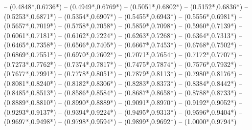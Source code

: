 {	-- ({0.4848*\dx},{0.6736*\dy}) %
	-- ({0.4949*\dx},{0.6769*\dy}) %
	-- ({0.5051*\dx},{0.6802*\dy}) %
	-- ({0.5152*\dx},{0.6836*\dy}) %
	-- ({0.5253*\dx},{0.6871*\dy}) %
	-- ({0.5354*\dx},{0.6907*\dy}) %
	-- ({0.5455*\dx},{0.6943*\dy}) %
	-- ({0.5556*\dx},{0.6981*\dy}) %
	-- ({0.5657*\dx},{0.7019*\dy}) %
	-- ({0.5758*\dx},{0.7058*\dy}) %
	-- ({0.5859*\dx},{0.7098*\dy}) %
	-- ({0.5960*\dx},{0.7139*\dy}) %
	-- ({0.6061*\dx},{0.7181*\dy}) %
	-- ({0.6162*\dx},{0.7224*\dy}) %
	-- ({0.6263*\dx},{0.7268*\dy}) %
	-- ({0.6364*\dx},{0.7313*\dy}) %
	-- ({0.6465*\dx},{0.7358*\dy}) %
	-- ({0.6566*\dx},{0.7405*\dy}) %
	-- ({0.6667*\dx},{0.7453*\dy}) %
	-- ({0.6768*\dx},{0.7502*\dy}) %
	-- ({0.6869*\dx},{0.7551*\dy}) %
	-- ({0.6970*\dx},{0.7602*\dy}) %
	-- ({0.7071*\dx},{0.7654*\dy}) %
	-- ({0.7172*\dx},{0.7707*\dy}) %
	-- ({0.7273*\dx},{0.7762*\dy}) %
	-- ({0.7374*\dx},{0.7817*\dy}) %
	-- ({0.7475*\dx},{0.7874*\dy}) %
	-- ({0.7576*\dx},{0.7932*\dy}) %
	-- ({0.7677*\dx},{0.7991*\dy}) %
	-- ({0.7778*\dx},{0.8051*\dy}) %
	-- ({0.7879*\dx},{0.8113*\dy}) %
	-- ({0.7980*\dx},{0.8176*\dy}) %
	-- ({0.8081*\dx},{0.8240*\dy}) %
	-- ({0.8182*\dx},{0.8306*\dy}) %
	-- ({0.8283*\dx},{0.8373*\dy}) %
	-- ({0.8384*\dx},{0.8442*\dy}) %
	-- ({0.8485*\dx},{0.8513*\dy}) %
	-- ({0.8586*\dx},{0.8584*\dy}) %
	-- ({0.8687*\dx},{0.8658*\dy}) %
	-- ({0.8788*\dx},{0.8733*\dy}) %
	-- ({0.8889*\dx},{0.8810*\dy}) %
	-- ({0.8990*\dx},{0.8889*\dy}) %
	-- ({0.9091*\dx},{0.8970*\dy}) %
	-- ({0.9192*\dx},{0.9052*\dy}) %
	-- ({0.9293*\dx},{0.9137*\dy}) %
	-- ({0.9394*\dx},{0.9224*\dy}) %
	-- ({0.9495*\dx},{0.9313*\dy}) %
	-- ({0.9596*\dx},{0.9404*\dy}) %
	-- ({0.9697*\dx},{0.9498*\dy}) %
	-- ({0.9798*\dx},{0.9594*\dy}) %
	-- ({0.9899*\dx},{0.9692*\dy}) %
	-- ({1.0000*\dx},{0.9794*\dy}) %
}
